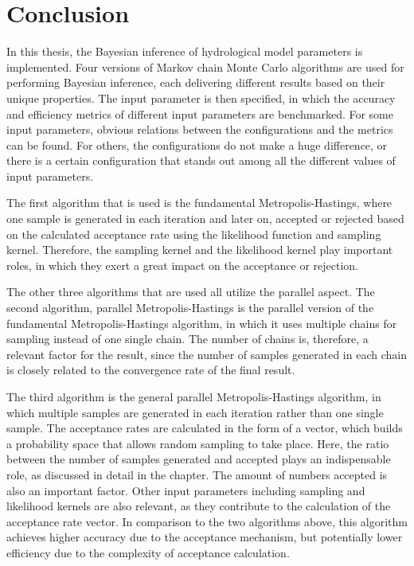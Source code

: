 \chapter{Conclusion}
In this thesis, the Bayesian inference of hydrological model parameters is implemented. Four versions of Markov chain Monte Carlo algorithms are used for performing Bayesian inference, each delivering different results based on their unique properties. The input parameter is then specified, in which the accuracy and efficiency metrics of different input parameters are benchmarked. For some input parameters, obvious relations between the configurations and the metrics can be found. For others, the configurations do not make a huge difference, or there is a certain configuration that stands out among all the different values of input parameters.

The first algorithm that is used is the fundamental Metropolis-Hastings, where one sample is generated in each iteration and later on, accepted or rejected based on the calculated acceptance rate using the likelihood function and sampling kernel. Therefore, the sampling kernel and the likelihood kernel play important roles, in which they exert a great impact on the acceptance or rejection.

The other three algorithms that are used all utilize the parallel aspect. The second algorithm, parallel Metropolis-Hastings is the parallel version of the fundamental Metropolis-Hastings algorithm, in which it uses multiple chains for sampling instead of one single chain. The number of chains is, therefore, a relevant factor for the result, since the number of samples generated in each chain is closely related to the convergence rate of the final result.

The third algorithm is the general parallel Metropolis-Hastings algorithm, in which multiple samples are generated in each iteration rather than one single sample. The acceptance rates are calculated in the form of a vector, which builds a probability space that allows random sampling to take place. Here, the ratio between the number of samples generated and accepted plays an indispensable role, as discussed in detail in the chapter. The amount of numbers accepted is also an important factor. Other input parameters including sampling and likelihood kernels are also relevant, as they contribute to the calculation of the acceptance rate vector. In comparison to the two algorithms above, this algorithm achieves higher accuracy due to the acceptance mechanism, but potentially lower efficiency due to the complexity of acceptance calculation.

